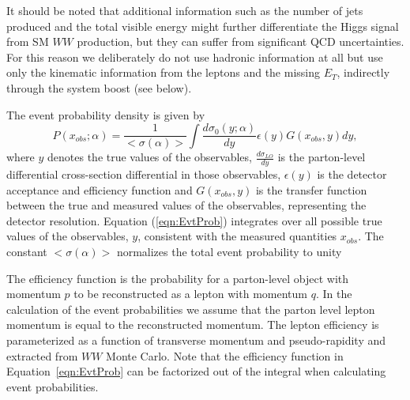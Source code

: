 It should be noted that additional information such as the number of jets
produced and the total visible energy might further differentiate the Higgs signal from SM
$WW$ production,
but they can suffer from significant  QCD uncertainties. For this reason we 
deliberately do not use hadronic information at all but use
only the kinematic information from the leptons and the missing $E_T$, indirectly
through the system boost (see below).

The event probability density is given by
\begin{equation}
P(x_{obs};\alpha) =
 \frac{1}{ < \sigma(\alpha) > }
 \int \frac {d \sigma_{0} (y;\alpha) }{ dy }
 \epsilon (y) G(x_{obs},y) dy,  
\label{eqn:EvtProb}  
\end{equation}
where $y$ denotes the true values of the observables,
$\frac{d \sigma_{LO}}{dy}$ is the  parton-level differential cross-section differential
in those observables, $\epsilon(y)$ is the detector acceptance and efficiency function
and $G(x_{obs},y)$ is the transfer function between the true and measured values of the
observables, representing the detector resolution.
Equation (\ref{eqn:EvtProb}) integrates over all possible true values of the
observables, $y$, consistent with the measured quantities $x_{obs}$.
The constant $<\sigma(\alpha)>$ normalizes the total event probability to unity

The efficiency function is the probability for a parton-level object with momentum 
$p$ to be reconstructed as a lepton with momentum $q$. In the calculation of the event 
probabilities we assume that the parton level lepton momentum is equal to the reconstructed 
momentum. The lepton efficiency is parameterized as a function of transverse momentum and 
pseudo-rapidity and extracted from $WW$ Monte Carlo. 
Note that the efficiency function in Equation~\ref{eqn:EvtProb} can be factorized out of
the integral when calculating event probabilities.

